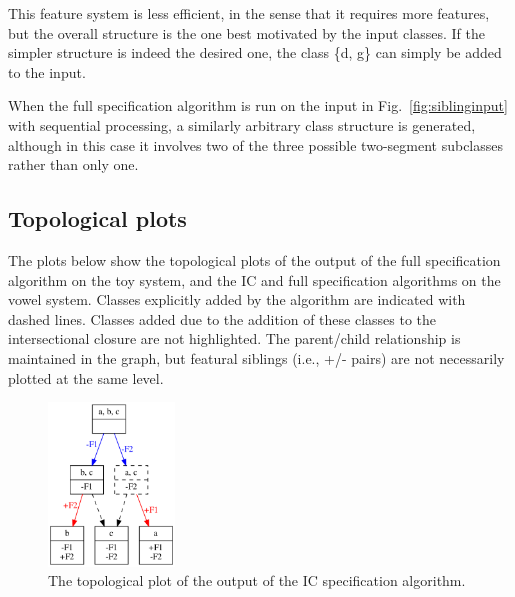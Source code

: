 \documentclass[12pt, oneside]{article}   	%
\begin{document}
This feature system is less efficient, in the sense that it requires more features, but the overall structure is the one best motivated by the input classes. If the simpler structure is indeed the desired one, the class \{d, g\} can simply be added to the input.

When the full specification algorithm is run on the input in Fig.~\ref{fig:siblinginput} with sequential processing, a similarly arbitrary class structure is generated, although in this case it involves two of the three possible two-segment subclasses rather than only one.

\subsection{Topological plots}
\label{app:topological}

The plots below show the topological plots of the output of the full specification algorithm on the toy system, and the IC and full specification algorithms on the vowel system. Classes explicitly added by the algorithm are indicated with dashed lines. Classes added due to the addition of these classes to the intersectional closure are not highlighted. The parent/child relationship is maintained in the graph, but featural siblings (i.e., +/- pairs) are not necessarily plotted at the same level.

\begin{figure}[htb!]
	\centering
	\includegraphics[width=0.3\textwidth]{toy_system_full_features_TOPOLOGICAL.png}
	\caption{The topological plot of the output of the IC specification algorithm.}
	\label{fig:toy_system_full_topological}
\end{figure}
\end{document}
